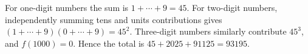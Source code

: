 For one-digit numbers the sum is $1+\cdots+9=45$. For two-digit numbers, independently summing tens and units contributions gives $(1+\cdots+9)(0+\cdots+9)=45^2$. Three-digit numbers similarly contribute $45^3$, and $f(1000)=0$. Hence the total is $45+2025+91125=\boxed{93195}$.
